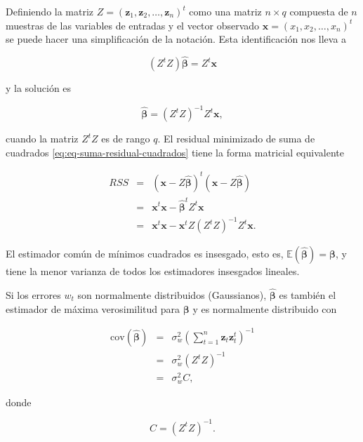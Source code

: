 \documentclass[12pt,]{krantz}
\theoremstyle{definition}
\theoremstyle{definition}
\theoremstyle{definition}
\theoremstyle{remark}
\begin{document}
Definiendo la matriz
\(Z=(\mathbf{z}_1,\mathbf{z}_2,\ldots,\mathbf{z}_n)^t\) como una matriz
\(n\times q\) compuesta de \(n\) muestras de las variables de entradas y
el vector observado \(\mathbf{x}=(x_1,x_2,\ldots,x_n)^t\) se puede hacer
una simplificación de la notación. Esta identificación nos lleva a

\begin{equation}
(Z^tZ)\hat{\mathbf{\beta}}=Z^t\mathbf{x}
\label{eq:eq-regresion-matriz}
\end{equation}

y la solución es

\begin{equation}
\hat{\mathbf{\beta}}=(Z^tZ)^{-1}Z^t\mathbf{x},
\label{eq:eq-solucion-regresion-matriz}
\end{equation}

cuando la matriz \(Z^tZ\) es de rango \(q\). El residual minimizado de
suma de cuadrados \eqref{eq:eq-suma-residual-cuadrados} tiene la forma
matricial equivalente

\begin{eqnarray}
RSS&=&(\mathbf{x}-Z\hat{\mathbf{\beta}})^t(\mathbf{x}-Z\hat{\mathbf{\beta}})\\ \nonumber
&=&\mathbf{x}^t\mathbf{x}-\hat{\mathbf{\beta}}^tZ^t\mathbf{x}\\ \nonumber
&=&\mathbf{x}^t\mathbf{x}-\mathbf{x}^tZ(Z^tZ)^{-1}Z^t\mathbf{x}.
\label{eq:eq-suma-residual-cuadrados-matricial}
\end{eqnarray}

El estimador común de mínimos cuadrados es insesgado, esto es,
\(\mathbb{E}(\hat{\mathbf{\beta}})=\mathbf{\beta}\), y tiene la menor
varianza de todos los estimadores insesgados lineales.

Si los errores \(w_t\) son normalmente distribuidos (Gaussianos),
\(\hat{\mathbf{\beta}}\) es también el estimador de máxima verosimilitud
para \(\mathbf{\beta}\) y es normalmente distribuido con

\begin{eqnarray}
\text{cov}(\hat{\mathbf{\beta}})&=&\sigma_w^2\left(\sum_{t=1}^{n}\mathbf{z}_t\mathbf{z}_t^t\right)^{-1}\\ \nonumber
&=&\sigma_w^2(Z^tZ)^{-1}\\ \nonumber
&=&\sigma_w^2C,
\label{eq:eq-covarianza-beta-estimado}
\end{eqnarray}

donde

\begin{equation}
C=(Z^tZ)^{-1}.
\label{eq:eq-matriz-C}
\end{equation}
\end{document}
